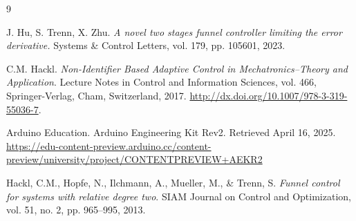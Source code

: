 \documentclass{article}
\begin{document}

\newpage
\begin{thebibliography}{9}



J. Hu, S. Trenn, X. Zhu.
\textit{A novel two stages funnel controller limiting the error derivative.}
Systems \& Control Letters, vol. 179, pp. 105601, 2023.

 C.M. Hackl.
 \textit{Non-Identifier Based Adaptive Control in Mechatronics–Theory and Application}.
 Lecture Notes in Control and Information Sciences, vol.
 466, Springer-Verlag, Cham, Switzerland, 2017.
 \url{http://dx.doi.org/10.1007/978-3-319-55036-7}.
 

Arduino Education. Arduino Engineering Kit Rev2. Retrieved April 16, 2025. \url{https://edu-content-preview.arduino.cc/content-preview/university/project/CONTENTPREVIEW+AEKR2}

Hackl, C.M., Hopfe, N., Ilchmann, A., Mueller, M., \& Trenn, S. \textit{Funnel control for systems with relative degree two}. SIAM Journal on Control and Optimization, vol. 51, no. 2, pp. 965–995, 2013.






\end{thebibliography}
\end{document}
